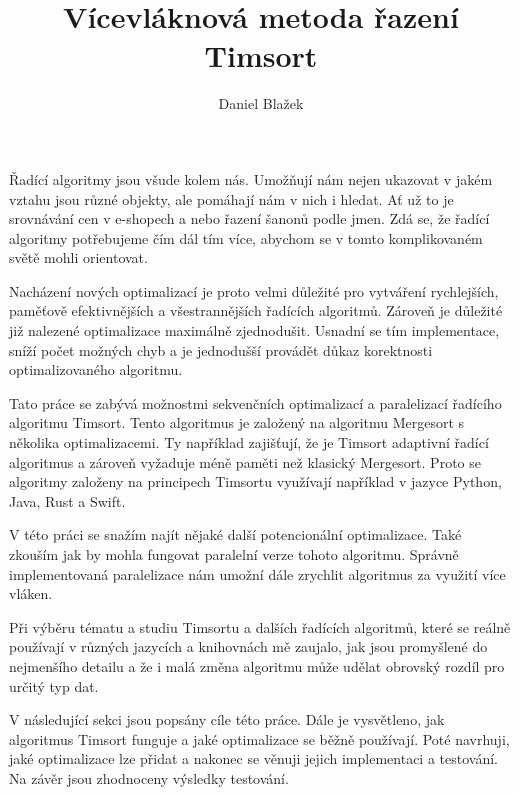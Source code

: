 \documentclass[thesis=B,czech]{FITthesis}[2019/12/23]
\title{Vícevláknová metoda řazení Timsort}
\author{Daniel Blažek} %
\begin{document}

\begin{introduction}


Řadící algoritmy jsou všude kolem nás. Umožňují nám nejen ukazovat v jakém vztahu jsou různé objekty, ale pomáhají nám v nich i hledat. Ať už to je srovnávání cen v e-shopech a nebo řazení šanonů podle jmen. Zdá se, že řadící algoritmy potřebujeme čím dál tím více, abychom se v tomto komplikovaném světě mohli orientovat.

Nacházení nových optimalizací je proto velmi důležité pro vytváření rychlejších, paměťově efektivnějších a všestrannějších řadících algoritmů. Zároveň je důležité již nalezené optimalizace maximálně zjednodušit. Usnadní se tím implementace, sníží počet možných chyb a je jednodušší provádět důkaz korektnosti optimalizovaného algoritmu.

Tato práce se zabývá možnostmi sekvenčních optimalizací a paralelizací řadícího algoritmu Timsort. Tento algoritmus je založený na algoritmu Mergesort s několika optimalizacemi. Ty například zajišťují, že je Timsort adaptivní řadící algoritmus a zároveň vyžaduje méně paměti než klasický Mergesort. Proto se algoritmy založeny na principech Timsortu využívají například v jazyce Python, Java, Rust a Swift.

V této práci se snažím najít nějaké další potencionální optimalizace. Také zkouším jak by mohla fungovat paralelní verze tohoto algoritmu. Správně implementovaná paralelizace nám umožní dále zrychlit algoritmus za využití více vláken.

Při výběru tématu a studiu Timsortu a dalších řadících algoritmů, které se reálně používají v různých jazycích a knihovnách mě zaujalo, jak jsou promyšlené do nejmenšího detailu a že i malá změna algoritmu může udělat obrovský rozdíl pro určitý typ dat.

V následující sekci jsou popsány cíle této práce. Dále je vysvětleno, jak algoritmus Timsort funguje a jaké optimalizace se běžně používají. Poté navrhuji, jaké optimalizace lze přidat a nakonec se věnuji jejich implementaci a testování. Na závěr jsou zhodnoceny výsledky testování.
\end{introduction}
\end{document}
